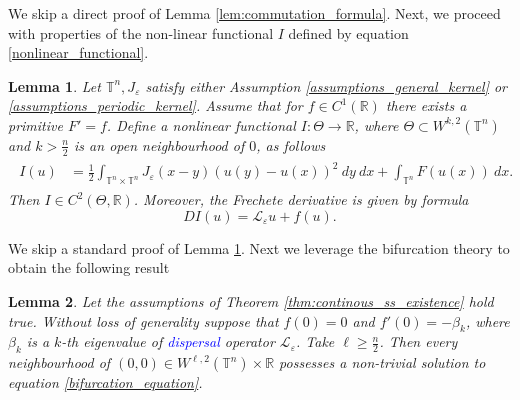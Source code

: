 \documentclass[12pt, a4paper]{article}
\theoremstyle{break}
\theoremstyle{break}
\theoremstyle{break}
\theoremstyle{break}
\newtheorem{lem}{Lemma}[section]
\theoremstyle{break}
\newcommand{\Leo}{\mathcal{L}_{\varepsilon}}
\begin{document}
We skip a direct proof of Lemma \ref{lem:commutation_formula}. Next, we proceed with properties of the non-linear functional $I$ defined by equation \eqref{nonlinear_functional}.

\begin{lem}
    Let $\mathbb{T}^n, J_\varepsilon$ satisfy either Assumption \ref{assumptions_general_kernel} or \ref{assumptions_periodic_kernel}. Assume that for $f \in C^1(\mathbb{R})$ there exists a primitive $F' = f$. Define a nonlinear functional $I:\Theta \rightarrow \mathbb{R}$, where $\Theta \subset W^{k, 2}(\mathbb{T}^n)$ and $k > \frac{n}{2}$ is an open neighbourhood of $0$, as follows
    \begin{align}
        \begin{split}
            I(u) 
            &= \frac{1}{2}\int_{\mathbb{T}^n \times \mathbb{T}^n} J_\varepsilon(x-y)\left(u(y) - u(x)\right)^2\:dy\:dx + \int_{\mathbb{T}^n} F(u(x)) \:dx. \label{nonlinear_functional}
        \end{split}
    \end{align}
    Then $I \in C^2(\Theta, \mathbb{R})$. Moreover, the Frechete derivative is given by formula
    \begin{equation*}
        DI(u) = \Leo u + f(u).
    \end{equation*}
    \label{lem:nonlinear_functional}
\end{lem}

We skip a standard proof of Lemma \ref{lem:nonlinear_functional}. Next we leverage the bifurcation theory to obtain the following result

\begin{lem}
    Let the assumptions of Theorem \ref{thm:continous_ss_existence} hold true. Without loss of generality suppose that $f(0) = 0$ and $f'(0) = -\beta_k$, where $\beta_k$ is a $k$-th eigenvalue of \textcolor{blue}{dispersal} operator $\Leo$. Take $\ell \geq \frac{n}{2}$. Then every neighbourhood of $(0, 0) \in W^{\ell,2}(\mathbb{T}^n) \times \mathbb{R}$ possesses a non-trivial solution to equation \eqref{bifurcation_equation}.
    \label{lem:bifurcation_existence}
\end{lem}
\end{document}

